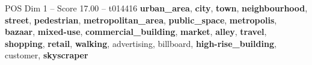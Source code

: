 \begin{textsample}{POS Dim 1 – Score 17.00 – t014416}  \label{ex:f1_pos_036}
\textbf{urban\_area}, \textbf{city}, \textbf{town}, \textbf{neighbourhood}, \textbf{street}, \textbf{pedestrian}, \textbf{metropolitan\_area}, \textbf{public\_space}, \textbf{metropolis}, \textbf{bazaar}, \textbf{mixed-use}, \textbf{commercial\_building}, \textbf{market}, \textbf{alley}, \textbf{travel}, \textbf{shopping}, \textbf{retail}, \textbf{walking}, advertising, billboard, \textbf{high-rise\_building}, customer, \textbf{skyscraper}

\end{textsample}

